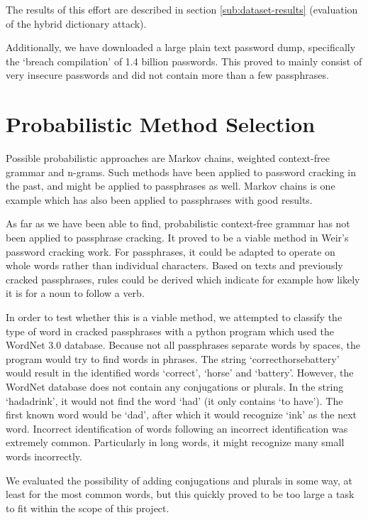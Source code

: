 \documentclass{article}
\begin{document}
The results of this effort are described in section \ref{sub:dataset-results}
(evaluation of the hybrid dictionary attack).

Additionally, we have downloaded a large plain text password dump, specifically
the `breach compilation' of 1.4 billion passwords. This proved to mainly
consist of very insecure passwords and did not contain more than a few
passphrases.


\section{Probabilistic Method Selection}\label{sec:methods-comparison}

Possible probabilistic approaches are Markov chains, weighted context-free
grammar and n-grams. Such methods have been applied to password cracking in
the past, and might be applied to passphrases as well. Markov chains is one
example which has also been applied to passphrases\cite{sparell-simovits} with
good results.

As far as we have been able to find, probabilistic context-free grammar has not
been applied to passphrase cracking. It proved to be a viable method in
Weir's\cite{weir} password cracking work. For passphrases, it could be adapted
to operate on whole words rather than individual characters. Based on texts and
previously cracked passphrases, rules could be derived which indicate for
example how likely it is for a noun to follow a verb.

In order to test whether this is a viable method, we attempted to classify the
type of word in cracked passphrases with a python program which used the
WordNet 3.0 database\cite{wordnet}. Because not all passphrases separate words
by spaces, the program would try to find words in phrases. The string
`correcthorsebattery' would result in the identified words `correct', `horse'
and `battery'. However, the WordNet database does not contain any conjugations
or plurals. In the string `hadadrink', it would not find the word `had' (it
only contains `to have'). The first known word would be `dad', after which it
would recognize `ink' as the next word. Incorrect identification of words
following an incorrect identification was extremely common. Particularly in
long words, it might recognize many small words incorrectly.

We evaluated the possibility of adding conjugations and plurals in some way, at
least for the most common words, but this quickly proved to be too large a task
to fit within the scope of this project.
\end{document}
